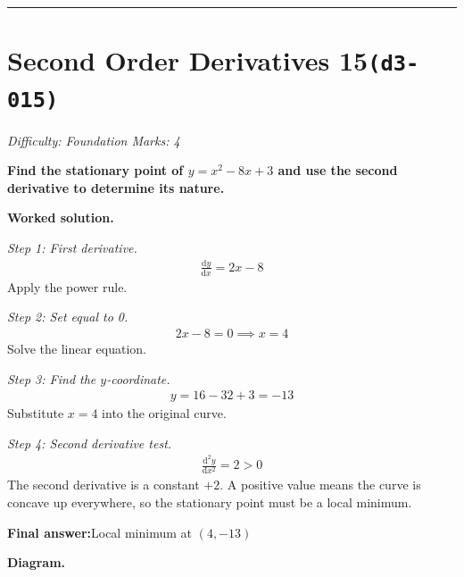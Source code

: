 \documentclass[11pt]{article}
\newcommand{\question}[1]{\par\medskip\noindent\textbf{#1}\par}
\begin{document}
\medskip\hrule

\section*{Second Order Derivatives 15\quad\small\texttt{(d3-015)}}
\textit{Difficulty: Foundation \quad\textbar\quad Marks: 4}

\question{Find the stationary point of \( y = x^2 - 8x + 3 \) and use the second derivative to determine its nature.}

\textbf{Worked solution.}

\textit{Step 1: First derivative.}
\[\begin{gathered}
\frac{\mathrm{d}y}{\mathrm{d}x} = 2x - 8
\end{gathered}\]
Apply the power rule.

\textit{Step 2: Set equal to 0.}
\[\begin{gathered}
2x - 8 = 0 \implies x = 4
\end{gathered}\]
Solve the linear equation.

\textit{Step 3: Find the \( y \)-coordinate.}
\[\begin{gathered}
y = 16 - 32 + 3 = -13
\end{gathered}\]
Substitute \( x = 4 \) into the original curve.

\textit{Step 4: Second derivative test.}
\[\begin{gathered}
\frac{\mathrm{d}^2y}{\mathrm{d}x^2} = 2 > 0
\end{gathered}\]
The second derivative is a constant \(+2\). A positive value means the curve is concave up everywhere, so the stationary point must be a local minimum.

\begin{answerbox}
\textbf{Final answer:}\quad Local minimum at \(\displaystyle  (4, -13) \)
\end{answerbox}
\textbf{Diagram.}
\end{document}
